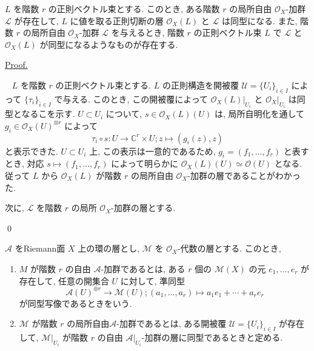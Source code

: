\documentclass[a4paper,10pt,dvipdfmx]{jsreport}
\newenvironment{theorem*}{\refstepcounter{theorem}\begin{itembox}[l]{\underline{Theorem \arabic{chapter}.\arabic{section}.\arabic{theorem}.}}\vspace{-0.5zh}\ }{\end{itembox}}
\newenvironment{defi*}{\refstepcounter{theorem}\begin{itembox}[l]{\underline{Definition \arabic{chapter}.\arabic{section}.\arabic{theorem}.}}\vspace{-0.5zh}\ }{\end{itembox}}
\renewenvironment{proof}{\begin{flushleft} \underline{Proof.} \end{flushleft}\vspace{-1zh}\ }{\qed\\}
\newcounter{theorem}[section]
\theoremstyle{definition}
\begin{document}
\begin{theorem*}
    \(L\) を階数 \(r\) の正則ベクトル束とする. このとき, ある階数 \(r\) の局所自由 \(\mathcal{O}_X\)-加群 \(\mathcal{L}\) が存在して, \(L\) に値を取る正則切断の層 \(\mathcal{O}_X(L)\) と \(\mathcal{L}\) は同型になる. また, 階数 \(r\) の局所自由 \(\mathcal{O}_X\)-加群 \(\mathcal{L}\) を与えるとき, 階数 \(r\) の正則ベクトル束 \(L\) で \(\mathcal{L}\) と \(\mathcal{O}_X(L)\) が同型になるようなものが存在する.
\end{theorem*}
\begin{proof}
    \(L\) を階数 \(r\) の正則ベクトル束とする. \(L\) の正則構造を開被覆 \(\mathcal{U} = \{U_i\}_{i\in I}\) によって \(\{\tau_i\}_{i\in I}\) で与える. このとき, この開被覆によって \(\mathcal{O}_X(L)|_{U_i}\) と \(\mathcal{O}_X|_{U_i}\) は同型となるこを示す. \(U\subset U_i\) について, \(s\in \mathcal{O}_X(L)(U)\) は, 局所自明化を通して \(g_i \in \mathcal{O}_X(U)^{\otimes r}\) によって
    \[
        \tau_i \circ s \colon U \to  \mathbb{C}^r \times U;z\mapsto (g_i(z),z)
    \]
    と表示できた. \(U\subset U_i\) 上, この表示は一意的であるため, \(g_i  = (f_1,\ldots,f_r)\) と表すとき, 対応 \(s \mapsto (f_1,\ldots,f_r)\) によって明らかに \(\mathcal{O}_X(L)(U) \simeq \mathcal{O}(U)\) となる. 従って \(L\) から \(\mathcal{O}_X(L)\) が階数 \(r\) の局所自由 \(\mathcal{O}_X\)-加群の層であることがわかった.

    次に, \(\mathcal{L}\) を階数 \(r\) の局所 \(\mathcal{O}_X\)-加群の層とする.

\end{proof}
\begin{defi*}
    \(\mathcal{A}\) をRiemann面 \(X\) 上の環の層とし, \(\mathcal{M}\) を \(\mathcal{O}_X\)-代数の層とする. このとき,
    \begin{enumerate}
        \item \(M\) が階数 \(r\) の自由 \(\mathcal{A}\)-加群であるとは, ある \(r\) 個の \(\mathcal{M}(X)\) の元 \(e_1,\ldots ,e_r\) が存在して, 任意の開集合 \(U\) に対して, 準同型
        \[
            \mathcal{A}(U)^{\oplus r} \to \mathcal{M}(U);(a_1,\ldots,a_r) \mapsto a_1 e_1 +\cdots +a_r e_r
        \]
        が同型写像であるときをいう.

        \item \(\mathcal{M}\) が階数 \(r\) の局所自由\(\mathcal{A}\)-加群であるとは, ある開被覆 \(\mathcal{U}=\{U_i\}_{i \in I}\) が存在して, \(\mathcal{M}|_{U_i}\) が階数 \(r\) の自由 \(\mathcal{A}|_{U_i}\)-加群の層に同型であるときと定める.
    \end{enumerate}
\end{defi*}
\end{document}
